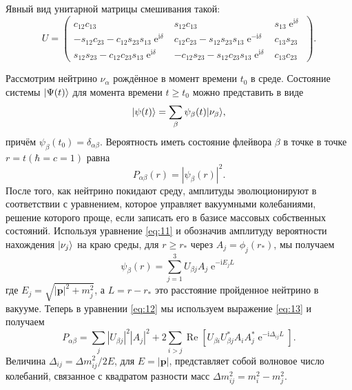 \documentclass[a4paper,12pt]{article}
\newcommand\Vect[1]{{\boldsymbol{#1}}}
\renewcommand{\Re}{\operatorname{Re}}
\renewcommand{\exp}{\operatorname{e}}
\renewcommand{\imath}{\mathrm{i}}
\DeclarePairedDelimiter\ket{|}{\rangle}
\begin{document}
	Явный вид унитарной матрицы смешивания такой:
	\begin{equation}
		U=
		\begin{pmatrix}
  			c_{12}c_{13} & s_{12}c_{13} & s_{13}\exp^{\imath\delta}\\
  			-s_{12}c_{23}-c_{12}s_{23}s_{13}\exp^{\imath\delta} & c_{12}c_{23}-s_{12}s_{23}s_{13}\exp^{-\imath\delta} & c_{13}s_{23}\\
  			s_{12}s_{23}-c_{12}c_{23}s_{13}\exp^{\imath\delta} & -c_{12}s_{23}-s_{12}c_{23}s_{13}\exp^{\imath\delta} & c_{13}c_{23}
  		\end{pmatrix}.
	\end{equation}

	Рассмотрим нейтрино \(\nu_{\alpha}\) рождённое в момент времени
	\(t_{0}\) в среде. Состояние системы \(\ket{\Psi(t)}\) для момента времени
	\(t\geqslant t_{0}\) можно представить в виде
	\begin{equation}
		\ket{\psi(t)}=\sum_{\beta}\psi_{\beta}(t)\ket{\nu_{\beta}},
	\end{equation}
	причём \(\psi_{\beta}(t_{0})=\delta_{\alpha\beta}\). Вероятность иметь
	состояние флейвора \(\beta\) в точке в точке \(r=t (\hbar=c=1)\) равна
	\begin{equation}\label{eq:12}
		P_{\alpha\beta}(r)=|\psi_{\beta}(r)|^{2}.
	\end{equation}
	После того, как нейтрино покидают среду, амплитуды
	эволюционируют в соответствии с уравнением, которое
	управляет вакуумными колебаниями, решение которого
	проще, если записать его в базисе массовых собственных
	состояний. Используя уравнение \eqref{eq:11} и обозначив амплитуду вероятности
	нахождения
	\(\ket{\nu_{j}}\) на краю среды, для \(r\geq r_{*}\) через \(A_{j}=\phi_{j}(r_{*})\), мы получаем
	\begin{equation}\label{eq:13}
		\psi_{\beta}(r)=\sum_{j=1}^{3}U_{\beta j}A_{j}\exp^{-\imath E_{j}L}
	\end{equation}
	где \(E_{j}=\sqrt{|\Vect{p}|^{2}+m_{j}^{2}}\), а \(L=r-r_{*}\) это расстояние
	пройденное нейтрино в вакууме. Теперь в
	уравнении \eqref{eq:12} мы используем выражение \eqref{eq:13} и получаем
	\begin{equation}\label{eq:17}
		P_{\alpha\beta}=\sum_{j}|U_{\beta j}|^{2}|A_{j}|^{2}+2\sum_{i>j}\Re[U_{\beta i}U_{\beta j}^{*}A_{i}A_{j}^{*}\exp^{-\imath\Delta_{ij}L}].
	\end{equation}
	Величина \(\Delta_{ij}=\Delta m_{ij}^2/2E\), для \(E=|\Vect{p}|\), представляет собой  волновое число колебаний, связанное с квадратом разности масс
	\(\Delta m_{ij}^{2}=m_{i}^{2}-m_{j}^{2}\).
\end{document}
